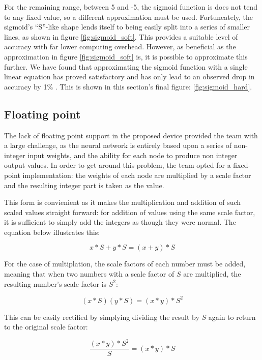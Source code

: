 For the remaining range, between 5 and -5, the sigmoid function is does not tend to any fixed value, so a different approximation must be used. Fortuneately, the sigmoid's ``S''-like shape lends itself to being easily split into a series of smaller lines, as shown in figure \ref{fig:sigmoid_soft}. This provides a suitable level of accuracy with far lower computing overhead. However, as beneficial as the approximation in figure \ref{fig:sigmoid_soft} is, it is possible to approximate this further. We have found that approximating the sigmoid function with a single
linear equation has proved satisfactory and has only lead to an observed drop in accuracy by 1\% . This is shown in this section's final figure: \ref{fig:sigmoid_hard}.

\subsection{Floating point}
The lack of floating point support in the proposed device provided the team with a large challenge, as the neural network is entirely based upon a series of non-integer input weights, and the ability for each node to produce non integer output values. In order to get around this problem, the team opted for a fixed-point implementation: the weights of each node are multiplied by a scale factor and the resulting integer part is taken as the value.

This form is convienient as it makes the multiplication and addition of such scaled values straight forward: for addition of values using the same scale factor, it is sufficient to simply add the integers as though they were normal. The equation below illustrates this:

\begin{equation}
\label{eq:bits:addition}
x*S+y*S=(x+y)*S
\end{equation}

For the case of multiplation, the scale factors of each number must be added, meaning that when two numbers with a scale factor of $S$ are multiplied, the resulting number's scale factor is $S^2$:

\begin{equation}
\label{eq:bits:multiplication}
(x*S)(y*S)=(x*y)*S^2
\end{equation}

This can be easily rectified by simplying dividing the result by $S$ again to return to the original scale factor:

\begin{equation}
\label{eq:bits:rescale}
\frac{(x*y)*S^2}{S}=(x*y)*S
\end{equation}

